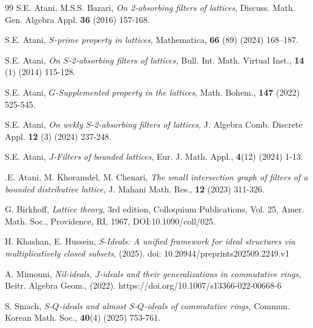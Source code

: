 \documentclass[preprint,review,10pt]{amsart}
\theoremstyle{definition}
\theoremstyle{remark}
\numberwithin{equation}{section}
\begin{document}
\begin{thebibliography}{99}
S.E. Atani, M.S.S. Bazari, {\it On 2-absorbing ﬁlters of lattices}, Discuss. Math. Gen. Algebra Appl. {\bf 36} (2016) 157-168.

S.E.  Atani, {\it $S$-prime property in lattices}, Mathematica, {\bf 66} (89) (2024)  168–187.

S.E.  Atani, {\it On $S$-2-absorbing filters of lattices,} Bull. Int. Math. Virtual Inst., {\bf 14} (1) (2014) 115-128.

S.E. Atani, {\it $G$-Supplemented property in the lattices}, Math. Bohem., {\bf 147} (2022) 525-545.

S.E. Atani, {\it On wekly $S$-2-absorbing filters of lattices,} J. Algebra Comb. Discrete Appl. {\bf 12} (3) (2024) 237-248.

S.E. Atani, {\it $J$-Filters of bounded lattices}, Eur. J. Math. Appl., {\bf 4}(12) (2024) 1-13.

.E. Atani, M. Khoramdel, M. Chenari, {\it The small intersection graph of ﬁlters of a bounded distributive lattice}, J. Mahani Math. Res., {\bf 12} (2023)  311-326.

G. Birkhoff, {\it Lattice theory,} 3rd edition, Colloquium Publications, Vol. 25, Amer. Math. Soc., Providence, RI, 1967, DOI:10.1090/coll/025.


H. Khashan, E. Hussein, {\it S-Ideals: A unified framework for ideal structures via multiplicatively closed subsets}, (2025). doi: 10.20944/preprints202509.2249.v1

A. Mimouni, {\it Nil-ideals, $J$-ideals and their generalizations in
commutative rings,}  Beitr. Algebra Geom., (2022). https://doi.org/10.1007/s13366-022-00668-6

S. Smach, {\it $S$-$Q$-ideals and almost $S$-$Q$-ideals of commutative rings,}  Commun. Korean Math. Soc., {\bf 40}(4)  (2025) 753-761.
\end{thebibliography}
\end{document}
